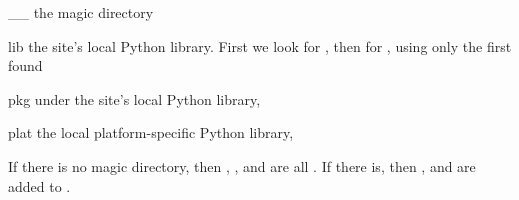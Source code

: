 \begin{memberdesc}[string]{__}
the magic directory
\end{memberdesc}

\begin{memberdesc}[string]{lib}
the site's local Python library. First we look for ,
then for , using only the first found
\end{memberdesc}

\begin{memberdesc}[string]{pkg}
 under the site's local Python library,
\end{memberdesc}

\begin{memberdesc}[string]{plat}
the local platform-specific Python library, 
\end{memberdesc}

If there is no magic directory, then \code{__}, ,  and
 are all . If there is, then ,  and
 are added to .
